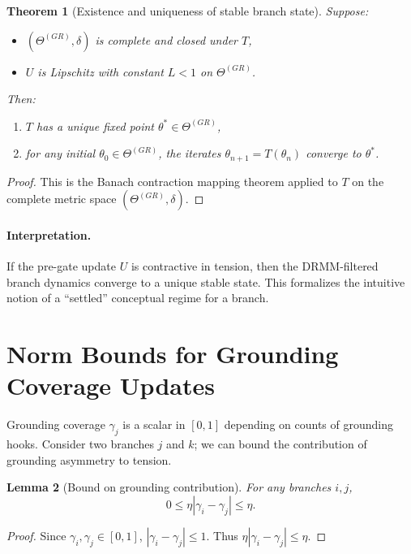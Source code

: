 \documentclass[11pt, a4paper]{article}
\newtheorem{theorem}{Theorem}
\newtheorem{lemma}[theorem]{Lemma}
\begin{document}
\begin{theorem}[Existence and uniqueness of stable branch state]
Suppose:
\begin{itemize}[nosep]
  \item $(\Theta^{(GR)},\delta)$ is complete and closed under $T$,
  \item $U$ is Lipschitz with constant $L<1$ on $\Theta^{(GR)}$.
\end{itemize}
Then:
\begin{enumerate}[nosep]
  \item $T$ has a unique fixed point $\theta^* \in \Theta^{(GR)}$,
  \item for any initial $\theta_0 \in \Theta^{(GR)}$, the iterates $\theta_{n+1}=T(\theta_n)$ converge to $\theta^*$.
\end{enumerate}
\end{theorem}

\begin{proof}
This is the Banach contraction mapping theorem applied to $T$ on the complete metric space $(\Theta^{(GR)},\delta)$.
\end{proof}

\paragraph{Interpretation.}
If the pre-gate update $U$ is contractive in tension, then the DRMM-filtered branch dynamics converge to a unique stable state.
This formalizes the intuitive notion of a ``settled'' conceptual regime for a branch.

\section{Norm Bounds for Grounding Coverage Updates}

Grounding coverage $\gamma_j$ is a scalar in $[0,1]$ depending on counts of grounding hooks.
Consider two branches $j$ and $k$; we can bound the contribution of grounding asymmetry to tension.

\begin{lemma}[Bound on grounding contribution]
For any branches $i,j$,
\[
0 \le \eta |\gamma_i - \gamma_j| \le \eta.
\]
\end{lemma}

\begin{proof}
Since $\gamma_i,\gamma_j \in [0,1]$, $|\gamma_i-\gamma_j| \le 1$.
Thus $\eta |\gamma_i-\gamma_j| \le \eta$.
\end{proof}
\end{document}
